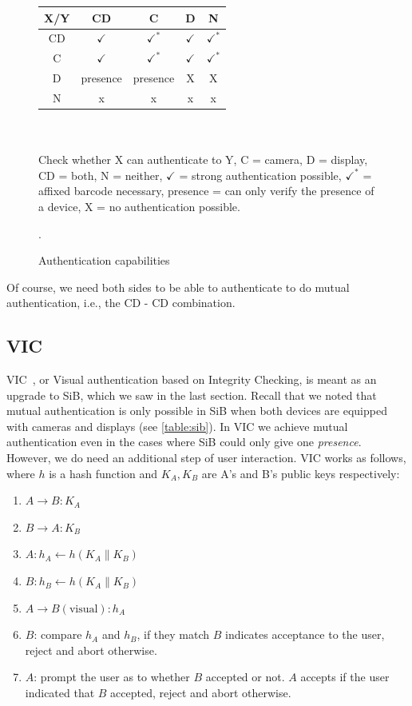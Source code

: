 \documentclass[conference, 11pt]{sty/IEEEtran}
\newlength{\arrow}
\begin{document}
\begin{figure}[h]
    \label{table:sib}
    \begin{tabular}{ c | c c c c }
      X/Y  & CD & C & D & N \\ \hline
        CD & $\checkmark$ & $\checkmark^*$ & $\checkmark$ & $\checkmark^*$ \\
        C & $\checkmark$ & $\checkmark^*$ & $\checkmark$ & $\checkmark^*$ \\
        D & presence & presence & X & X \\
        N & x & x & x & x \\
    \end{tabular}
    \\ \\
    \small{Check whether X can authenticate to Y, C = camera, D = display, CD = both, N = neither, $\checkmark$ = strong authentication possible, $\checkmark^*$ = affixed barcode necessary, presence = can only verify the presence of a device, X = no authentication possible.}
    \caption{Authentication capabilities}.
\end{figure}

Of course, we need both sides to be able to authenticate to do mutual authentication, i.e., the CD - CD combination.

\subsection{VIC}
\label{ssec:vic}

VIC~\cite{saxena2006secure}, or Visual authentication based on Integrity Checking, is meant as an upgrade to SiB, which we saw in the last section.
Recall that we noted that mutual authentication is only possible in SiB when both devices are equipped with cameras and displays (see \autoref{table:sib}).
In VIC we achieve mutual authentication even in the cases where SiB could only give one \emph{presence}.
However, we do need an additional step of user interaction.
VIC works as follows, where $h$ is a hash function and $K_A, K_B$ are A's and B's public keys respectively:

\begin{enumerate}
    \item $A \rightarrow B: K_A$
    \item $B \rightarrow A: K_B$
    \item $A: h_A \gets h(K_A \| K_B)$
    \item $B: h_B \gets h(K_A \| K_B)$
    \item $A \rightarrow B(\text{visual}): h_A$
    \item $B$: compare $h_A$ and $h_B$, if they match $B$ indicates acceptance to the user, reject and abort otherwise.
    \item $A$: prompt the user as to whether $B$ accepted or not. $A$ accepts if the user indicated that $B$ accepted, reject and abort otherwise.
\end{enumerate}
\end{document}
